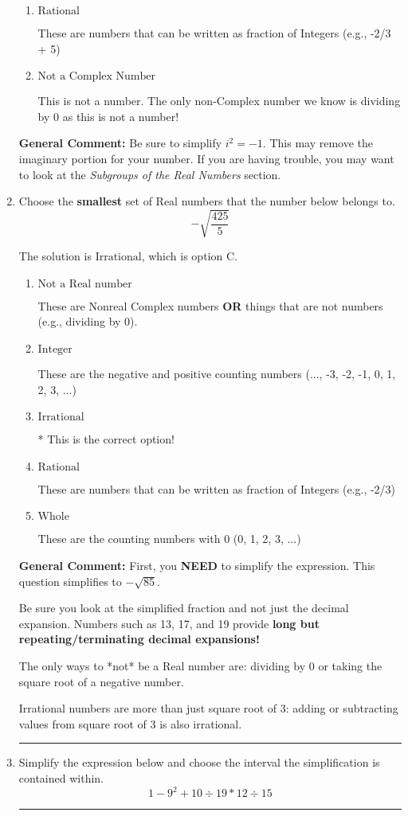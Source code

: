 \documentclass{extbook}[14pt]
\newcommand{\litem}[1]{\item #1

\rule{\textwidth}{0.4pt}}
\begin{document}
\begin{enumerate}
{\begin{enumerate}[label=\Alph*.]
* This is the correct option!
\item \( \text{Rational} \)

These are numbers that can be written as fraction of Integers (e.g., -2/3 + 5)
\item \( \text{Not a Complex Number} \)

This is not a number. The only non-Complex number we know is dividing by 0 as this is not a number!
\end{enumerate}

\textbf{General Comment:} Be sure to simplify $i^2 = -1$. This may remove the imaginary portion for your number. If you are having trouble, you may want to look at the \textit{Subgroups of the Real Numbers} section.
}
\litem{
Choose the \textbf{smallest} set of Real numbers that the number below belongs to.
\[ -\sqrt{\frac{425}{5}} \]

The solution is \( \text{Irrational} \), which is option C.\begin{enumerate}[label=\Alph*.]
\item \( \text{Not a Real number} \)

These are Nonreal Complex numbers \textbf{OR} things that are not numbers (e.g., dividing by 0).
\item \( \text{Integer} \)

These are the negative and positive counting numbers (..., -3, -2, -1, 0, 1, 2, 3, ...)
\item \( \text{Irrational} \)

* This is the correct option!
\item \( \text{Rational} \)

These are numbers that can be written as fraction of Integers (e.g., -2/3)
\item \( \text{Whole} \)

These are the counting numbers with 0 (0, 1, 2, 3, ...)
\end{enumerate}

\textbf{General Comment:} First, you \textbf{NEED} to simplify the expression. This question simplifies to $-\sqrt{85}$. 
 
 Be sure you look at the simplified fraction and not just the decimal expansion. Numbers such as 13, 17, and 19 provide \textbf{long but repeating/terminating decimal expansions!} 
 
 The only ways to *not* be a Real number are: dividing by 0 or taking the square root of a negative number. 
 
 Irrational numbers are more than just square root of 3: adding or subtracting values from square root of 3 is also irrational.
}
\litem{
Simplify the expression below and choose the interval the simplification is contained within.
\[ 1 - 9^2 + 10 \div 19 * 12 \div 15 \]

}
\end{enumerate}
\end{document}
